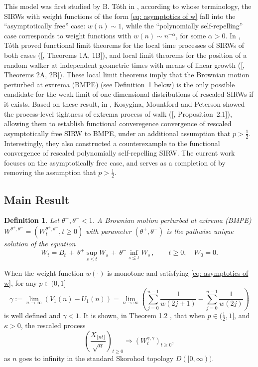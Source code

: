 \documentclass[twoside,12pt,a4paper]{article}
\newtheorem{definition}{Definition}[section]
\numberwithin{equation}{section}
\begin{document}
	This model was first studied by B. T\'oth in \cite{T96}, according to whose terminology, the SIRWs with weight functions of the form \eqref{eq: asymptotics of w} fall into the ``asymptotically free'' case: $w(n)\sim 1$, while the ``polynomially self-repelling'' case corresponds to weight functions with $w(n)\sim n^{-\alpha}$, for some $\alpha >0$. In \cite{T96}, T\'oth proved functional limit theorems for the local time processes of SIRWs of both cases ([\cite{T96}, Theorems 1A, 1B]), and local limit theorems for the position of a random walker at independent geometric times with means of linear growth ([\cite{T96}, Theorems 2A, 2B]). These local limit theorems imply that the Brownian motion perturbed at extrema (BMPE) (see Definition~\ref{defn:BMPE} below) is the only possible candidate for the weak limit of one-dimensional distributions of rescaled SIRWs if it exists. 
	Based on these result, in \cite{KMP22}, Kosygina, Mountford and Peterson showed the process-level tightness of extrema process of walk ([\cite{KMP22}, Proposition~2.1]), allowing them to establish functional converegence convergence of rescaled asymptotically free SIRW to BMPE, under an additional assumption that $p > \frac{1}{2}$. Interestingly, they also constructed a counterexample to the functional convergence of rescaled polynomially self-repelling SIRW. The current work focuses on the asymptotically free case, and serves as a completion of \cite{KMP22} by removing the assumption that  $p > \frac{1}{2}$.

	
	

	\subsection{Main Result}
	\begin{definition}
		\label{defn:BMPE}
		Let $\theta^+, \theta^- <1$. A Brownian motion perturbed at
		extrema (BMPE) $W^{\theta^+, \theta^-} = \left(W^{\theta^+, \theta^-}_t, t\geq 0\right)$ with parameter  $(\theta^+, \theta^-)$ is the pathwise unique solution of the equation
		$$
		W_t = B_t \,+\, \theta^+ \sup_{s\leq t} W_s  \,+\, \theta^- \inf_{s\leq t} W_s \,,   \qquad t \ge 0, \quad W_0 = 0.
		$$
	\end{definition}
	When the weight function $w(\cdot )$ is monotone and satisfying \eqref{eq: asymptotics of w}, for any $p\in (0,1]$
	\begin{equation}\label{eq: gamma}
		\gamma:= \lim_{n\to \infty}\left( V_1(n) - U_1(n) \right) =\lim_{n\to \infty} \left( \sum_{j=0}^{n-1} \frac{1}{ w(2j+1)}-  \sum_{j=0}^{n-1}  \frac{1}{w(2j)} \right) 
	\end{equation}
	is well defined and $\gamma<1$. It is shown, in Theorem 1.2 \cite{KMP22}, that when $p\in (\frac{1}{2},1]$, and $\kappa >0 $, the rescaled process
	$$
	\left(  \frac{X_{\lfloor nt \rfloor }}{\sqrt{n}}  \right)_{t\geq 0} \Longrightarrow \left( W^{\gamma,\gamma}_{t}\right)_{t\geq 0},
	$$ as $n$ goes to infinity in the standard Skorohod topology $D([0,\infty) ).$
	
\end{document}
